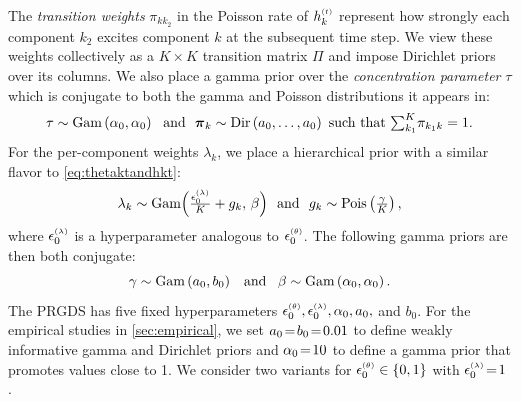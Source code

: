 \documentclass{article}
\begin{document}
The \emph{transition weights} $\pi_{kk_2}$ in the Poisson rate of $\hkt$ represent how strongly each component $k_2$ excites component $k$ at the subsequent time step. We view these weights collectively as a $K \!\times\! K$ transition matrix $\Pi$ and impose Dirichlet priors over its columns. We also place a gamma prior over the \emph{concentration parameter} $\tau$ which is conjugate to both the gamma and Poisson distributions it appears in:~
\begin{equation}
\tau \sim \Gam{\alpha_0, \alpha_0} \,\,\textrm{ and }\,\,
\boldsymbol{\pi}_k \sim \textrm{Dir}\left(a_0,\dots,a_0\right) \textrm{ such that }\mathsmaller{\sum_{k_1}}^K \pi_{k_1k}=1.
\end{equation}
For the per-component weights $\lambda_k$, we place a hierarchical prior with a similar flavor to \cref{eq:thetaktandhkt}:~ 
\begin{equation}
\label{eq:lambdakandgk}
\lambda_k \sim \textrm{Gam}\Big(\tfrac{\epslambda}{K} + g_k,\, \beta\Big) \,\,\textrm{ and }\,\,g_k \sim \Pois{\tfrac{\gamma}{K}},
% 
\end{equation}
where $\epslambda$ is a hyperparameter analogous to $\epstheta$. The following gamma priors are then both conjugate:~
\begin{equation}
\gamma \sim \textrm{Gam}\left( a_0,b_0 \right) \,\,\,\textrm{ and }\,\,\, \beta \sim \textrm{Gam}\left( \alpha_0, \alpha_0 \right).
\end{equation}
The PRGDS has five fixed hyperparameters $\epstheta,\epslambda,\alpha_0,a_0,$ and $b_0$. For the empirical studies in \cref{sec:empirical}, we set $a_0\!=\! b_0 \!=\! 0.01$ to define weakly informative gamma and Dirichlet priors and $\alpha_0 \!=\! 10$ to define a gamma prior that promotes values close to 1. We consider two variants for $\epstheta \in \{0,1\}$ with $\epslambda \teq 1$.~
\end{document}
